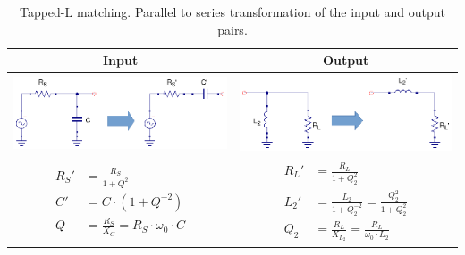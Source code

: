 \begin{table}[H]
  \centering
  \begin{tabular}{ | c | c | }
    \hline
    Input & Output\\ \hline
    \begin{minipage}{.4\textwidth}
      \includegraphics[width=\linewidth]{Tapped-L-transformation-input}
    \end{minipage}
    &
    \begin{minipage}{.4\textwidth}
      \includegraphics[width=\linewidth]{Tapped-L-transformation-output}
    \end{minipage}
\\ \hline
    \begin{minipage}{.4\textwidth}
         {\begin{align}
           R_S' &= \frac{R_S}{1 + Q^2}\\
           C' &= C \cdot (1+Q^{-2})\\
           Q &= \frac{R_S}{X_C} = R_S \cdot \omega_0 \cdot C
         \end{align}}
    \end{minipage}
    &
        \begin{minipage}{.4\textwidth}
         {\begin{align}
           R_L' &= \frac{R_L}{1 + Q_2^2}\\
           L_2' &= \frac{L_2}{1 + Q_2^{-2}} = \frac{Q_2^2}{1 + Q_2^2}\\
           Q_2 &= \frac{R_L}{X_{L_2}} = \frac{R_L}{\omega_0 \cdot L_2}
         \end{align}}
    \end{minipage}
    \\ \hline
  \end{tabular}
  \caption{Tapped-L matching. Parallel to series transformation of the input and output pairs.}
  \label{tbl:tapped-L-matching}
\end{table}

